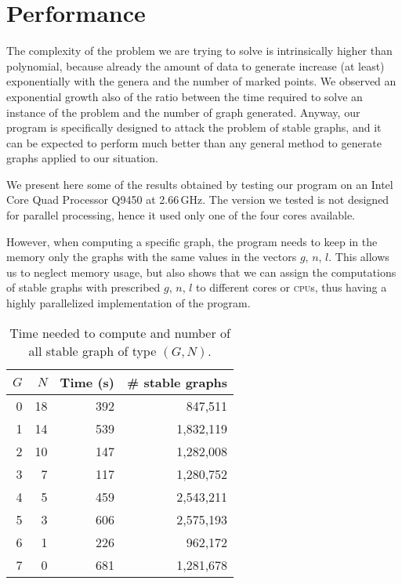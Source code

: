 \documentclass{amsart}
\theoremstyle{plain}
\theoremstyle{definition}
\begin{document}
\section{Performance}

The complexity of the problem we are trying to solve is intrinsically
higher than polynomial, because already the amount of data to generate
increase (at least) exponentially with the genera and the number of
marked points. We observed an exponential growth also of the ratio
between the time required to solve an instance of the problem and the
number of graph generated. Anyway, our program is specifically
designed to attack the problem of stable graphs, and it can be
expected to perform much better than any general method to generate
graphs applied to our situation.

We present here some of the results obtained by testing our program on an
Intel\textregistered{} Core Quad Processor Q9450 at
2.66\,GHz. The version we tested is not designed for parallel
processing, hence it used only one of the four cores
available.

However, when computing a specific graph, the program needs to keep in the
memory only the graphs with the same values in the vectors $g$, $n$,
$l$. This allows us to neglect memory usage, but also shows that we
can assign the computations of stable graphs with prescribed $g$, $n$,
$l$ to different cores or \textsc{cpu}s, thus having a highly
parallelized implementation of the program.

\begin{table}\label{tab:number}
  \begin{tabular}{rrrr}
    $G$ & $N$ & Time (s) & \# stable graphs\\
    \hline
    0 & 18 & 392 &   847,511\\
    1 & 14 & 539 & 1,832,119\\
    2 & 10 & 147 & 1,282,008\\
    3 &  7 & 117 & 1,280,752\\
    4 &  5 & 459 & 2,543,211\\
    5 &  3 & 606 & 2,575,193\\
    6 &  1 & 226 &   962,172\\
    7 &  0 & 681 & 1,281,678\\
  \end{tabular}
  \caption{Time needed to compute and number of all stable graph of type $(G,N)$.}
\end{table}
\end{document}
